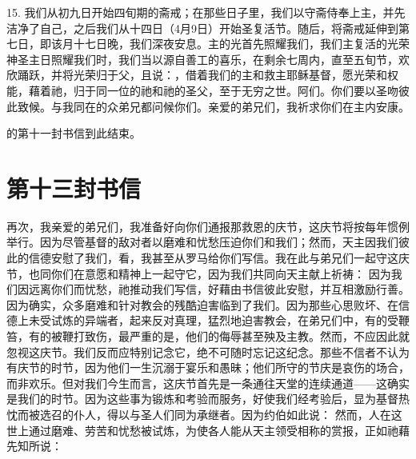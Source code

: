 15. 我们从初九日开始四旬期的斋戒；在那些日子里，我们以守斋侍奉上主，并先洁净了自己，之后我们从十四日（4月9日）开始圣复活节。随后，将斋戒延伸到第七日，即该月十七日晚，我们深夜安息。主的光首先照耀我们，我们主复活的光荣神圣主日照耀我们时，我们当以源自善工的喜乐，在剩余七周内，直至五旬节，欢欣踊跃，并将光荣归于父，且说：，借着我们的主和救主耶稣基督，愿光荣和权能，藉着祂，归于同一位的祂和祂的圣父，至于无穷之世。阿们。你们要以圣吻彼此致候。与我同在的众弟兄都问候你们。亲爱的弟兄们，我祈求你们在主内安康。\par

的第十一封书信到此结束。\par



\section{第十三封书信}

\par

再次，我亲爱的弟兄们，我准备好向你们通报那救恩的庆节，这庆节将按每年惯例举行。因为尽管基督的敌对者以磨难和忧愁压迫你们和我们；然而，天主因我们彼此的信德安慰了我们，看，我甚至从罗马给你们写信。我在此与弟兄们一起守这庆节，也同你们在意愿和精神上一起守它，因为我们共同向天主献上祈祷：  因为我们因远离你们而忧愁，祂推动我们写信，好藉由书信彼此安慰，并互相激励行善。因为确实，众多磨难和针对教会的残酷迫害临到了我们。因为那些心思败坏、在信德上未受试炼的异端者，起来反对真理，猛烈地迫害教会，在弟兄们中，有的受鞭笞，有的被鞭打致伤，最严重的是，他们的侮辱甚至殃及主教。然而，不应因此就忽视这庆节。我们反而应特别记念它，绝不可随时忘记这纪念。那些不信者不认为有庆节的时节，因为他们一生沉溺于宴乐和愚昧；他们所守的节庆是哀伤的场合，而非欢乐。但对我们今生而言，这庆节首先是一条通往天堂的连续通道——这确实是我们的时节。因为这些事为锻炼和考验而服务，好使我们经考验后，显为基督热忱而被选召的仆人，得以与圣人们同为承继者。因为约伯如此说： 然而，人在这世上通过磨难、劳苦和忧愁被试炼，为使各人能从天主领受相称的赏报，正如祂藉先知所说： \par

